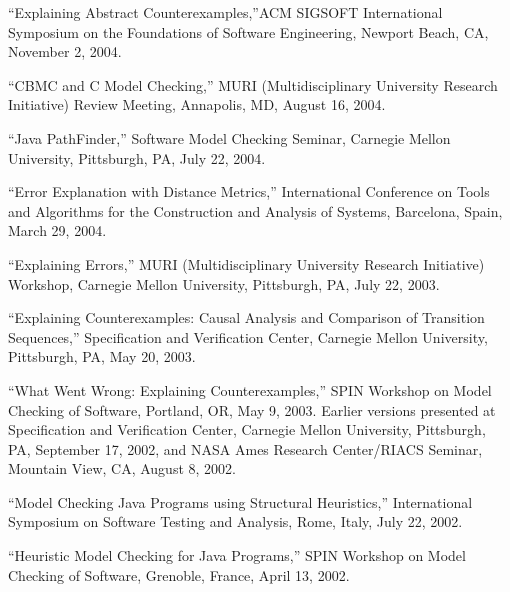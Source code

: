 \documentclass[ComputerScience]{vita}
\begin{document}
\begin{vita}
\begin{Selected Presentations}
  \item ``Explaining Abstract Counterexamples,''ACM SIGSOFT International Symposium on the Foundations of Software Engineering, Newport Beach, CA, November 2, 2004.



  \item ``CBMC and C Model Checking,'' MURI (Multidisciplinary University Research Initiative) Review Meeting, Annapolis, MD, August 16, 2004.

  \item ``Java PathFinder,'' Software Model Checking Seminar, Carnegie Mellon University, Pittsburgh, PA, July 22, 2004.

  \item ``Error Explanation with Distance Metrics,'' International Conference on Tools and Algorithms for the Construction and Analysis of Systems, Barcelona, Spain, March 29, 2004.  



  \item ``Explaining Errors,'' MURI (Multidisciplinary University Research Initiative) Workshop, Carnegie Mellon University, Pittsburgh, PA, July 22, 2003.

  \item ``Explaining Counterexamples: Causal Analysis and Comparison of Transition Sequences,''  Specification and Verification Center, Carnegie Mellon University, Pittsburgh, PA, May 20, 2003.

  \item ``What Went Wrong: Explaining Counterexamples,''  SPIN Workshop on Model Checking of Software, Portland, OR, May 9, 2003.  Earlier versions presented at Specification and Verification Center, Carnegie Mellon University, Pittsburgh, PA, September 17, 2002, and NASA Ames Research Center/RIACS Seminar, Mountain View, CA, August 8, 2002.



  \item ``Model Checking Java Programs using Structural Heuristics,''  International Symposium on Software Testing and Analysis, Rome, Italy, July 22, 2002.

  \item ``Heuristic Model Checking for Java Programs,''  SPIN Workshop on Model Checking of Software, Grenoble, France, April 13, 2002.


\end{Selected Presentations}
\end{vita}
\end{document}
